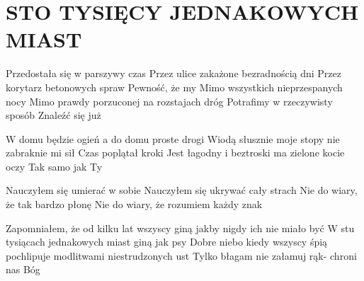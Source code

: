 \documentclass[../../../songbook.tex]{subfiles}
\begin{document}
\TabPositions{8cm} %
\section*{STO TYSIĘCY JEDNAKOWYCH MIAST}
{}
\vspace{0.5cm}
Przedostała się w parszywy czas			 \newline
Przez ulice zakażone bezradnością dni	 \newline
Przez korytarz betonowych spraw			 \newline
Pewność, że my							 \newline
Mimo wszystkich nieprzespanych nocy \newline
Mimo prawdy porzuconej na rozstajach dróg \newline
Potrafimy w rzeczywisty sposób \newline
Znaleźć się już \newline

W domu będzie ogień a do domu proste drogi \newline
Wiodą słusznie moje stopy nie zabraknie mi sił \newline
Czas poplątał kroki \newline
Jest łagodny i beztroski ma zielone kocie oczy \newline
Tak samo jak Ty \newline

\-\hspace{1cm} Nauczyłem się umierać w sobie		 \newline
\-\hspace{1cm} Nauczyłem się ukrywać cały strach	 \newline
\-\hspace{1cm} Nie do wiary, że tak bardzo płonę	 \newline
\-\hspace{1cm} Nie do wiary, że rozumiem każdy znak	 \newline	

Zapomniałem, że od kilku lat wszyscy giną jakby nigdy ich nie miało być \newline
W stu tysiącach jednakowych miast giną jak psy \newline
Dobre niebo kiedy wszyscy śpią pochlipuje modlitwami niestrudzonych ust \newline
Tylko błagam nie załamuj rąk- chroni nas Bóg \newline
\end{document}
